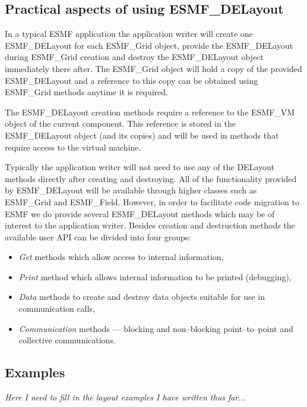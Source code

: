
\subsection{Practical aspects of using ESMF\_DELayout}
In a typical ESMF application the application writer will create one ESMF\_DELayout for each ESMF\_Grid object, provide the ESMF\_DELayout during ESMF\_Grid creation and destroy the ESMF\_DELayout object immediately there after. The ESMF\_Grid object will hold a copy of the provided ESMF\_DELayout and a reference to this copy can be obtained using ESMF\_Grid methods anytime it is required.

The ESMF\_DELayout creation methods require a reference to the ESMF\_VM object of the current component. This reference is stored in the ESMF\_DELayout object (and its copies) and will be used in methods that require access to the virtual machine.

Typically the application writer will not need to use any of the DELayout methods directly after creating and destroying. All of the functionality provided by ESMF\_DELayout will be available through higher classes such as ESMF\_Grid and ESMF\_Field. However, in order to facilitate code migration to ESMF we do provide several ESMF\_DELayout methods which may be of interest to the application writer. Besides creation and destruction methods the available user API can be divided into four groups:
\begin{itemize}
\item {\em Get} methods which allow access to internal information,
\item {\em Print} method which allows internal information to be printed (debugging),
\item {\em Data} methods to create and destroy data objects suitable for use in communication calls,
\item {\em Communication} methods --- blocking and non--blocking point--to--point and collective communications.
\end{itemize}

\subsection{Examples}
{\em Here I need to fill in the layout examples I have written thus far...}
